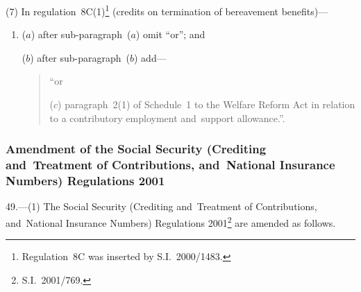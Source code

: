 \documentclass[12pt,a4paper]{article}
\begin{document}
(7) In regulation~8C(1)\footnote{Regulation~8C was inserted by S.I.~2000/1483.} (credits on termination of bereavement benefits)—
\begin{enumerate}\item[]
($a$) after sub-paragraph~($a$)  omit “or”; and

($b$) after sub-paragraph~($b$)  add—

\begin{quotation}
“or

($c$) paragraph~2(1) of Schedule~1 to the Welfare Reform Act in relation to a contributory employment and~support allowance.”.
\end{quotation}
\end{enumerate}

\subsubsection[49. Amendment of the Social Security (Crediting and~Treatment of Contributions, and~National Insurance Numbers) Regulations 2001]{Amendment of the Social Security (Crediting and~Treatment of Contributions, and~National Insurance Numbers) Regulations 2001}

49.---(1)  The Social Security (Crediting and~Treatment of Contributions, and~National Insurance Numbers) Regulations 2001\footnote{S.I.~2001/769.} are amended as follows.
\end{document}
